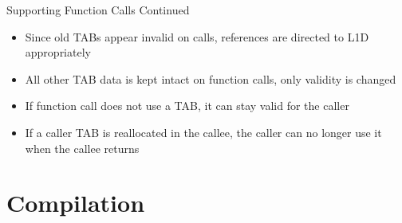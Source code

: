 \documentclass{beamer}
\begin{document}
\begin{frame}{Supporting Function Calls Continued}
   \begin{itemize}
      \item Since old TABs appear invalid on calls, references are directed to
         L1D appropriately
      \item All other TAB data is kept intact on function calls, 
         only validity is changed
      \item If function call does not use a TAB, it can stay valid for the caller
      \item If a caller TAB is reallocated in the callee, the caller can no longer
         use it when the callee returns
   \end{itemize}
\end{frame}
\section{Compilation}
\end{document}
